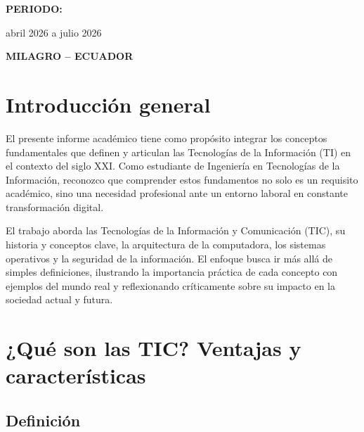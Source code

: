 \documentclass[12pt,a4paper]{article}
\begin{document}
\begin{center}
		\vspace{1cm}
		
		{\fontsize{13}{15}\selectfont\bfseries PERIODO:\par}
		\vspace{0.2cm}
		{\fontsize{13}{15}\selectfont abril 2026 a julio 2026\par}
		
		\vfill
		
		{\fontsize{13}{15}\selectfont\bfseries MILAGRO -- ECUADOR\par}
		
		\vspace*{1cm}
		
	\end{center}
	
	\clearpage
	\thispagestyle{fancy}
	\tableofcontents
	\clearpage
	
	
	\section{Introducción general}
	
	El presente informe académico tiene como propósito integrar los conceptos fundamentales que definen y articulan las Tecnologías de la Información (TI) en el contexto del siglo XXI. Como estudiante de Ingeniería en Tecnologías de la Información, reconozco que comprender estos fundamentos no solo es un requisito académico, sino una necesidad profesional ante un entorno laboral en constante transformación digital.
	
	El trabajo aborda las Tecnologías de la Información y Comunicación (TIC), su historia y conceptos clave, la arquitectura de la computadora, los sistemas operativos y la seguridad de la información. El enfoque busca ir más allá de simples definiciones, ilustrando la importancia práctica de cada concepto con ejemplos del mundo real y reflexionando críticamente sobre su impacto en la sociedad actual y futura.
	
	\section{¿Qué son las TIC? Ventajas y características}
	
	\subsection{Definición}
	
\end{document}

